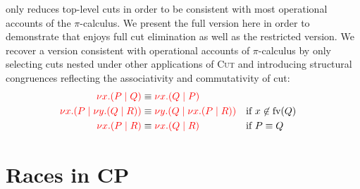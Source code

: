 \documentclass[a4paper,UKenglish]{lipics-v2016}
\begin{document}
only reduces top-level cuts in order to be consistent with most operational
accounts of the $\pi$-calculus.
%
We present the full version here in order to demonstrate that \nodcap enjoys
full cut elimination as well as the restricted version.
%
We recover a version consistent with operational accounts of $\pi$-calculus by
only selecting cuts nested under other applications of \textsc{Cut} and
introducing structural congruences reflecting the associativity and
commutativity of cut:
\begin{align*}
  \textcolor{red}{{\nu x.} (P \mid Q)} &\equiv \textcolor{red}{{\nu x.} (Q \mid P)} \\
  \textcolor{red}{{\nu x.} (P \mid {\ensuremath{\nu y.}} (Q \mid R))} &\equiv \textcolor{red}{{\nu y.} (Q \mid {\ensuremath{\nu x.}} (P \mid R))} && \text{if $x \not\in \text{fv}(Q)$} \\
  \textcolor{red}{{\nu x.} (P \mid R)} &\equiv \textcolor{red}{{\nu x.} (Q \mid R)} &&\text{if $P \equiv Q$}
\end{align*}
%
%




\section{Races in CP}
\label{sec:races}
\end{document}
